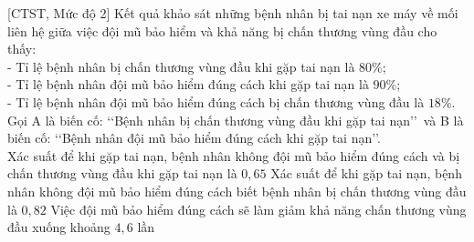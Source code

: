 \begin{ex}%
[CTST, Mức độ 2]%
	Kết quả khảo sát những bệnh nhân bị tai nạn xe máy về mối liên hệ giữa việc đội mũ bảo hiểm và khả năng bị chấn thương vùng đầu cho thấy:\\
	- Tỉ lệ bệnh nhân bị chấn thương vùng đầu khi gặp tai nạn là $80 \%$;\\
	- Tỉ lệ bệnh nhân đội mũ bảo hiểm đúng cách khi gặp tai nạn là $90 \%$;\\
	- Tỉ lệ bệnh nhân đội mũ bảo hiểm đúng cách bị chấn thương vùng đầu là $18 \%$.\\
	Gọi A là biến cố: \lq\lq Bệnh nhân bị chấn thương vùng đầu khi gặp tai nạn\rq\rq\, và B là biến cố: \lq\lq Bệnh nhân đội mũ bảo hiểm đúng cách khi gặp tai nạn\rq\rq.\\
	{Xác suất để khi gặp tai nạn, bệnh nhân không đội mũ bảo hiểm đúng cách và bị chấn thương vùng đầu khi gặp tai nạn là $0{,}65$}
	{\True Xác suất để khi gặp tai nạn, bệnh nhân không đội mũ bảo hiểm đúng cách biết bệnh nhân bị chấn thương vùng đầu là $0{,}82$}
	{\True Việc đội mũ bảo hiểm đúng cách sẽ làm giảm khả năng chấn thương vùng đầu xuống khoảng $4{,}6$ lần}
\end{ex}


